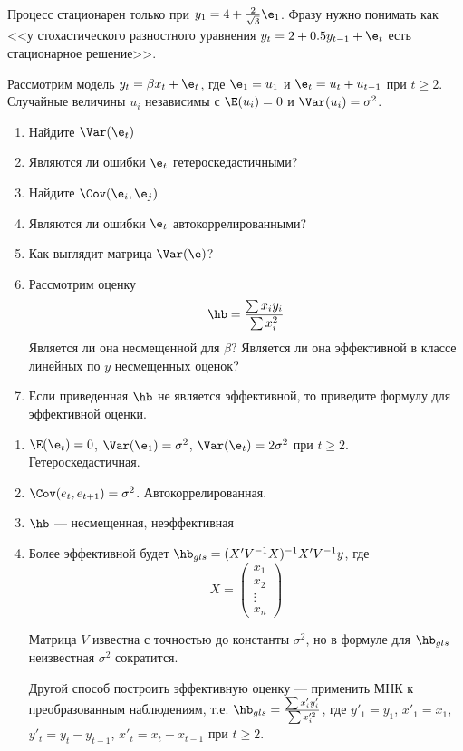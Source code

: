 \documentclass[pdftex,11pt,openany]{book}\usepackage[]{graphicx}\usepackage[]{color}
\begin{document}
\begin{solution}
Процесс стационарен только при $y_1=4+\frac{2}{\sqrt{3}}\e_1$. Фразу нужно понимать как <<у стохастического разностного уравнения $y_t=2+0.5y_{t-1}+\e_t$ есть стационарное решение>>.
\end{solution}


\begin{problem}
Рассмотрим модель $y_t=\beta x_t +\e_t$, где $\e_1=u_1$ и $\e_t=u_t+u_{t-1}$ при $t\geq 2$. Случайные величины $u_i$ независимы с $\E(u_i)=0$ и $\Var(u_i)=\sigma^2$. 
\begin{enumerate}
\item Найдите $\Var(\e_t)$
\item Являются ли ошибки $\e_t$ гетероскедастичными?
\item Найдите $\Cov(\e_i,\e_j)$
\item Являются ли ошибки $\e_t$ автокоррелированными?
\item Как выглядит матрица $\Var(\e)$?
\item Рассмотрим оценку
\[
\hb=\frac{\sum x_i y_i}{\sum x_i^2}
\]
Является ли она несмещенной для $\beta$? Является ли она эффективной в классе линейных по $y$ несмещенных оценок?
\item Если приведенная $\hb$ не является эффективной, то приведите формулу для эффективной оценки.
\end{enumerate}
\end{problem}


\begin{solution}
\begin{enumerate}
\item $\E(\e_t)=0$, $\Var(\e_1)=\sigma^2$, $\Var(\e_t)=2\sigma^2$ при $t\geq 2$.  Гетероскедастичная.
\item $\Cov(e_t,e_{t+1})=\sigma^2$. Автокоррелированная.
\item $\hb$ --- несмещенная, неэффективная
\item Более эффективной будет $\hb_{gls}=(X'V^{-1}X)^{-1}X'V^{-1}y$, где 
\[
X=\begin{pmatrix}
x_1 \\
x_2 \\
\vdots \\
x_n
\end{pmatrix}
\]

Матрица $V$ известна с точностью до константы $\sigma^2$, но в формуле для $\hb_{gls}$ неизвестная $\sigma^2$ сократится.

Другой способ построить эффективную оценку --- применить МНК к преобразованным наблюдениям, т.е. $\hb_{gls}=\frac{\sum x'_i y'_i}{\sum x_i^{\prime 2}}$, где $y'_1=y_1$, $x'_1=x_1$, $y'_t=y_t-y_{t-1}$, $x'_t=x_t-x_{t-1}$ при $t\geq 2$.
\end{enumerate}
\end{solution}
\end{document}
